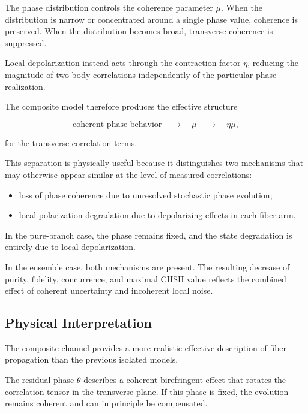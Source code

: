 The phase distribution controls the coherence parameter \( \mu \). When the distribution is narrow or concentrated around a single phase value, coherence is preserved. When the distribution becomes broad, transverse coherence is suppressed.

Local depolarization instead acts through the contraction factor \( \eta \), reducing the magnitude of two-body correlations independently of the particular phase realization.

The composite model therefore produces the effective structure

\[
\text{coherent phase behavior}
\quad
\longrightarrow
\quad
\mu
\quad
\longrightarrow
\quad
\eta\mu,
\]

for the transverse correlation terms.

This separation is physically useful because it distinguishes two mechanisms that may otherwise appear similar at the level of measured correlations:

\begin{itemize}
    \item loss of phase coherence due to unresolved stochastic phase evolution;
    \item local polarization degradation due to depolarizing effects in each fiber arm.
\end{itemize}

In the pure-branch case, the phase remains fixed, and the state degradation is entirely due to local depolarization.

In the ensemble case, both mechanisms are present. The resulting decrease of purity, fidelity, concurrence, and maximal CHSH value reflects the combined effect of coherent uncertainty and incoherent local noise.


\subsection*{Physical Interpretation}

The composite channel provides a more realistic effective description of fiber propagation than the previous isolated models.

The residual phase \( \theta \) describes a coherent birefringent effect that rotates the correlation tensor in the transverse plane. If this phase is fixed, the evolution remains coherent and can in principle be compensated.

